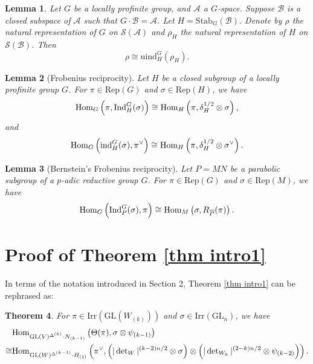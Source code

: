 \documentclass[11pt,reqno]{amsart}
\renewcommand{\1}{{\mathbf{1}}} \newcommand{\sB}{{\mathscr{B}}}
\newcommand{\BW}{{\mathbb {W}}} \newcommand{\BX}{{\mathbb {X}}}
\newcommand{\CA}{{\mathcal {A}}} \newcommand{\CB}{{\mathcal {B}}}
\newcommand{\CS}{{\mathcal {S}}} \newcommand{\CT}{{\mathcal {T}}}
\newcommand{\fg}{{\mathfrak{g}}} \newcommand{\fh}{{\mathfrak{h}}}
\newcommand{\GL}{{\mathrm{GL}}}\newcommand{\G}{{\mathrm{G}}}
\newcommand{\Ind}{{\mathrm{Ind}}} \newcommand{\ind}{{\mathrm{ind}}}
\newcommand{\Irr}{{\mathrm{Irr}}} \newcommand{\cInd}{{\mathrm{c-Ind}}}
\newcommand{\Rep}{{\mathrm{Rep}}}\newcommand{\rec}{{\mathrm{rec}}} \newcommand{\rat}{{\mathrm{ra}}}
\newcommand{\Stab}{{\mathrm{Stab}}}\newcommand{\Symb}{{\mathrm{Symb}}}
\newcommand{\tr}{{\mathrm{tr}}}\newcommand{\tor}{{\mathrm{tor}}}
\newcommand{\pair}[1]{\langle {#1} \rangle}
\theoremstyle{plain}
\newtheorem{thm}{Theorem}[section] \newtheorem{cor}[thm]{Corollary}
\newtheorem{lem}[thm]{Lemma}  \newtheorem{prop}[thm]{Proposition}
\theoremstyle{definition}
\numberwithin{equation}{section}
\begin{document}
\begin{lem}\label{lem ind}\cite[Lemme 1.3]{min}
Let $G$ be a locally profinite group, and $\CA$ a $G$-space. Suppose $\CB$ is a closed subspace of $\CA$ such that $G\cdot \CB=\CA$. Let $H=\Stab_G(\CB)$. Denote by $\rho$ the natural representation of $G$ on $\CS(\CA)$ and $\rho_H$ the natural representation of $H$ on $\CS(\CB)$. Then
$$\rho\cong\mathrm{uind}_H^G(\rho_H).$$
\end{lem}

\begin{lem}[Frobenius reciprocity]\label{lem frob}
Let $H$ be a closed subgroup of a locally profinite group $G$. For $\pi\in\Rep(G)$ and $\sigma\in\Rep(H)$, we have
$$\Hom_G\left(\pi,\Ind_H^G(\sigma)\right)\cong\Hom_H\left(\pi,\delta_H^{1/2}\otimes\sigma\right),$$
and
$$\Hom_G\left(\ind_H^G(\sigma),\pi^\vee\right)\cong\Hom_H\left(\pi,\delta_H^{1/2}\otimes\sigma^\vee\right).$$
\end{lem}

\begin{lem}[Bernstein's Frobenius reciprocity]\label{lem bernstein}
Let $P=MN$ be a parabolic subgroup of a $p$-adic reductive group $G$. For $\pi\in\Rep(G)$ and $\sigma\in\Rep(M)$, we have
$$\Hom_G\left(\Ind_P^G(\sigma),\pi\right)\cong\Hom_M\left(\sigma,R_{\overline{P}}(\pi)\right).$$
\end{lem}


\section{Proof of Theorem \ref{thm intro1}}

In terms of the notation introduced in Section 2, Theorem \ref{thm intro1} can be rephrased as: 

\begin{thm}\label{thm intro1-new}
For $\pi\in\Irr(\GL(W_{(k)}))$ and $\sigma\in\Irr(\GL_n)$, we have
$$\begin{aligned}&\Hom_{\GL(V)^{\Delta^{(k)}}\cdot N_{(k-1)}}\left(\Theta(\pi),\sigma\otimes\psi_{(k-1)}\right)\\\cong&\Hom_{\GL(W)^{\Delta^{(k-1)}}\cdot H_{(1)}}\left(\pi^\vee,
\left(|\det\nolimits_W|^{(k-2)n/2}\otimes\sigma\right)\otimes\left(|\det\nolimits_{W_k}|^{(2-k)n/2}\otimes\psi_{(k-2)}\right)\right).\end{aligned}$$
\end{thm}
\end{document}
